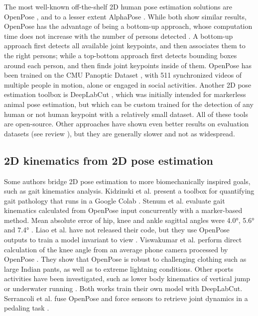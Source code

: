 The most well-known off-the-shelf 2D human pose estimation solutions are OpenPose \cite{Cao2019}, and to a lesser extent AlphaPose \cite{Fang2017}. While both show similar results, OpenPose has the advantage of being a bottom-up approach, whose computation time does not increase with the number of persons detected \cite{Cao2019}. A bottom-up approach first detects all available joint keypoints, and then associates them to the right persons; while a top-bottom approach first detects bounding boxes around each person, and then finds joint keypoints inside of them. OpenPose has been trained on the CMU Panoptic Dataset \cite{Joo2015}, with 511 synchronized videos of multiple people in motion, alone or engaged in social activities. Another 2D pose estimation toolbox is DeepLabCut \cite{Mathis2018}, which was initially intended for markerless animal pose estimation, but which can be custom trained for the detection of any human or not human keypoint with a relatively small dataset. All of these tools are open-source. Other approaches have shown even better results on evaluation datasets (see review \cite{Chen2020}), but they are generally slower and not as widespread.

\subsection{2D kinematics from 2D pose estimation}

Some authors bridge 2D pose estimation to more biomechanically inspired goals, such as gait kinematics analysis. Kidzinski et al. present a toolbox for quantifying gait pathology that runs in a Google Colab \cite{Kidziński2020}. Stenum et al. evaluate gait kinematics calculated from OpenPose input concurrently with a marker-based method. Mean absolute error of hip, knee and ankle sagittal angles were 4.0°, 5.6° and 7.4° \cite{Stenum2021}. Liao et al. have not released their code, but they use OpenPose outputs to train a model invariant to view \cite{Liao2020}. Viswakumar et al. perform direct calculation of the knee angle from an average phone camera processed by OpenPose \cite{Viswakumar2019}. They show that OpenPose is robust to challenging clothing such as large Indian pants, as well as to extreme lightning conditions. Other sports activities have been investigated, such as lower body kinematics of vertical jump \cite{Drazan2021} or underwater running \cite{Cronin2019}. Both works train their own model with DeepLabCut. Serrancoli et al. fuse OpenPose and force sensors to retrieve joint dynamics in a pedaling task \cite{Serrancolí2020}. 


